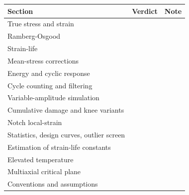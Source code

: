 \documentclass[11pt]{article}
\begin{document}
\begin{table}[h]
\centering
\small
\begin{tabular}{p{6.5cm} p{2.5cm} p{5cm}}
\toprule
Section & Verdict & Note \\
\midrule
True stress and strain & & \\
Ramberg-Osgood & & \\
Strain-life & & \\
Mean-stress corrections & & \\
Energy and cyclic response & & \\
Cycle counting and filtering & & \\
Variable-amplitude simulation & & \\
Cumulative damage and knee variants & & \\
Notch local-strain & & \\
Statistics, design curves, outlier screen & & \\
Estimation of strain-life constants & & \\
Elevated temperature & & \\
Multiaxial critical plane & & \\
Conventions and assumptions & & \\
\bottomrule
\end{tabular}
\end{table}
\end{document}
